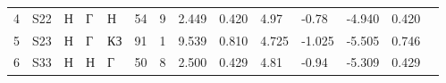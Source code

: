 \begin{tabular}{|l|l|l|l|l|l|l|l|l|l|l|l|l|l}
4                                        & S22                                            & Н      & Г       & Н      & 54                                              & 9                                               & 2.449                                   & 0.420                                     & 4.97                                            & -0.78                                            & -4.940                                            & 0.420                                          &  \\ \cline{1-13}
5                                        & S23                                            & Н      & Г       & КЗ     & 91                                              & 1                                               & 9.539                                   & 0.810                                     & 4.725                                           & -1.025                                           & -5.505                                            & 0.746                                          &  \\ \cline{1-13}
6                                        & S33                                            & Н      & Н       & Г      & 50                                              & 8                                               & 2.500                                   & 0.429                                     & 4.81                                            & -0.94                                            & -5.309                                            & 0.429                                          &  \\ \cline{1-13}
\end{tabular}
